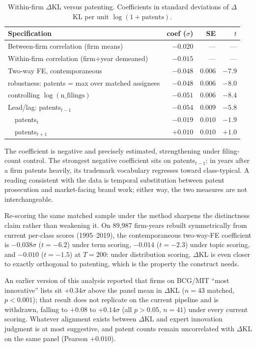 \documentclass[11pt]{article}
\newcommand{\dkl}{$\Delta$KL}
\begin{document}
\begin{table}[tbp]\centering\small
\caption{Within-firm \dkl{} versus patenting. Coefficients in standard
deviations of \dkl{} per unit $\log(1 + \mathrm{patents})$.}
\label{tab:patent_within_firm}
\begin{tabular}{lrrr}
\toprule
Specification & coef ($\sigma$) & SE & $t$ \\
\midrule
Between-firm correlation (firm means) & $-0.020$ & --- & --- \\
Within-firm correlation (firm+year demeaned) & $-0.015$ & --- & --- \\
Two-way FE, contemporaneous & $-0.048$ & $0.006$ & $-7.9$ \\
\quad robustness: patents = max over matched assignees & $-0.048$ & $0.006$ & $-8.0$ \\
\quad controlling $\log(\mathrm{n\_filings})$ & $-0.051$ & $0.006$ & $-8.4$ \\
Lead/lag: patents$_{t-1}$ & $-0.054$ & $0.009$ & $-5.8$ \\
\quad\quad\quad\ \ patents$_{t}$ & $-0.019$ & $0.010$ & $-1.9$ \\
\quad\quad\quad\ \ patents$_{t+1}$ & $+0.010$ & $0.010$ & $+1.0$ \\
\bottomrule
\end{tabular}
\end{table}

The coefficient is negative and precisely estimated, strengthening under
filing-count control. The strongest negative coefficient sits on
patents$_{t-1}$: in years after a firm patents heavily, its trademark
vocabulary regresses toward class-typical. A reading consistent with the
data is temporal substitution between patent prosecution and market-facing
brand work; either way, the two measures are not interchangeable.

Re-scoring the same matched sample under the method sharpens the
distinctness claim rather than weakening it. On 89{,}987 firm-years
rebuilt symmetrically from current per-class scores (1995--2019), the
contemporaneous two-way-FE coefficient is $-0.038\sigma$ ($t = -6.2$)
under term scoring, $-0.014$ ($t = -2.3$) under topic scoring, and
$-0.010$ ($t = -1.5$) at $T = 200$: under distribution scoring, \dkl{}
is even closer to exactly orthogonal to patenting, which is the property
the construct needs.

An earlier version of this analysis reported that firms on BCG/MIT
``most innovative'' lists sit $+0.34\sigma$ above the panel mean in
\dkl{} ($n = 43$ matched, $p < 0.001$); that result does not replicate on
the current pipeline and is withdrawn, falling to $+0.08$ to $+0.14\sigma$
(all $p > 0.05$, $n = 41$) under every current scoring. Whatever alignment
exists between \dkl{} and expert innovation judgment is at most
suggestive, and patent counts remain uncorrelated with \dkl{} on the same
panel (Pearson $+0.010$).
\end{document}
